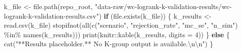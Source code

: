 \documentclass[
  12pt]{article}
\newenvironment{Shaded}{\begin{snugshade}}{\end{snugshade}}
\newcommand{\AttributeTok}[1]{\textcolor[rgb]{0.40,0.45,0.13}{#1}}
\newcommand{\ControlFlowTok}[1]{\textcolor[rgb]{0.00,0.23,0.31}{\textbf{#1}}}
\newcommand{\DecValTok}[1]{\textcolor[rgb]{0.68,0.00,0.00}{#1}}
\newcommand{\FunctionTok}[1]{\textcolor[rgb]{0.28,0.35,0.67}{#1}}
\newcommand{\NormalTok}[1]{\textcolor[rgb]{0.00,0.23,0.31}{#1}}
\newcommand{\OtherTok}[1]{\textcolor[rgb]{0.00,0.23,0.31}{#1}}
\newcommand{\SpecialCharTok}[1]{\textcolor[rgb]{0.37,0.37,0.37}{#1}}
\newcommand{\StringTok}[1]{\textcolor[rgb]{0.13,0.47,0.30}{#1}}
\begin{document}
\begin{Shaded}
\begin{Highlighting}[]
\NormalTok{k\_file }\OtherTok{\textless{}{-}} \FunctionTok{file.path}\NormalTok{(repo\_root, }\StringTok{"data{-}raw/wc{-}logrank{-}k{-}validation{-}results/wc{-}logrank{-}k{-}validation{-}results.csv"}\NormalTok{)}
\ControlFlowTok{if}\NormalTok{ (}\FunctionTok{file.exists}\NormalTok{(k\_file)) \{}
\NormalTok{  k\_results }\OtherTok{\textless{}{-}} \FunctionTok{read.csv}\NormalTok{(k\_file)}
  \FunctionTok{stopifnot}\NormalTok{(}\FunctionTok{all}\NormalTok{(}\FunctionTok{c}\NormalTok{(}\StringTok{"scenario"}\NormalTok{, }\StringTok{"rejection\_rate"}\NormalTok{, }\StringTok{"mc\_se"}\NormalTok{, }\StringTok{"n\_sim"}\NormalTok{) }\SpecialCharTok{\%in\%} \FunctionTok{names}\NormalTok{(k\_results)))}
  \FunctionTok{print}\NormalTok{(knitr}\SpecialCharTok{::}\FunctionTok{kable}\NormalTok{(k\_results, }\AttributeTok{digits =} \DecValTok{4}\NormalTok{))}
\NormalTok{\} }\ControlFlowTok{else}\NormalTok{ \{}
  \FunctionTok{cat}\NormalTok{(}\StringTok{"**Results placeholder.** No K{-}group output is available.}\SpecialCharTok{\textbackslash{}n\textbackslash{}n}\StringTok{"}\NormalTok{)}
\NormalTok{\}}
\end{Highlighting}
\end{Shaded}
\end{document}
